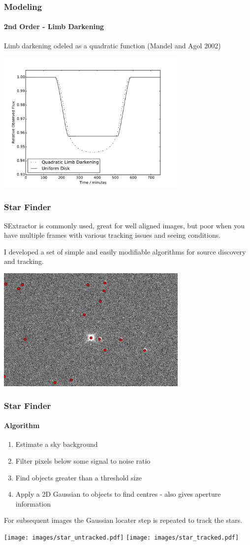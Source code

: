 \documentclass{beamer}
\begin{document}
  \begin{frame}
  \frametitle{Modeling}
    \framesubtitle{2nd Order - Limb Darkening}
    Limb darkening odeled as a quadratic function (Mandel and Agol 2002)
    \begin{center}
    \includegraphics[width=0.7\textwidth]{images/model_comparison.pdf}
    \end{center}
  \end{frame}
  \begin{frame}
  \frametitle{Star Finder}
  SExtractor is commonly used, great for well aligned images, but poor when you have multiple frames with various tracking issues and seeing conditions.

  I developed a set of simple and easily modifiable algorithms for source discovery and tracking.
  \begin{center}
    \includegraphics[width=0.7\textwidth]{images/starfinder_zoom.png}
  \end{center}
  \end{frame}
  \begin{frame}
  \frametitle{Star Finder}
    \framesubtitle{Algorithm}
    \begin{enumerate}
        \item Estimate a sky background
        \item Filter pixels below some signal to noise ratio
        \item Find objects greater than a threshold size
        \item Apply a 2D Gaussian to objects to find centres - also gives aperture information
    \end{enumerate}
    For subsequent images the Gaussian locater step is repeated to track the stars.
    \begin{center}
        \texttt{[image: images/star\_untracked.pdf]}\quad
        \texttt{[image: images/star\_tracked.pdf]}
    \end{center}
  \end{frame}
\end{document}
